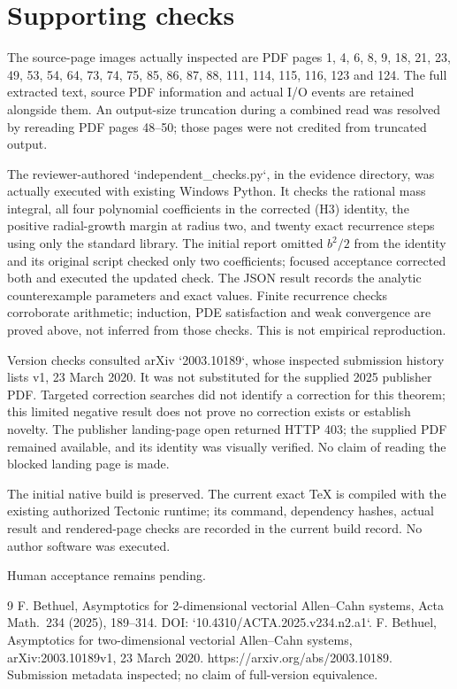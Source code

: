 \documentclass[10pt]{article}
\begin{document}
\section*{Supporting checks}
The source-page images actually inspected are PDF pages 1, 4, 6, 8, 9, 18, 21, 23, 49, 53, 54, 64, 73, 74, 75, 85, 86, 87, 88, 111, 114, 115, 116, 123 and 124. The full extracted text, source PDF information and actual I/O events are retained alongside them. An output-size truncation during a combined read was resolved by rereading PDF pages 48–50; those pages were not credited from truncated output.\par
The reviewer-authored `independent\_checks.py`, in the evidence directory, was actually executed with existing Windows Python. It checks the rational mass integral, all four polynomial coefficients in the corrected (H3) identity, the positive radial-growth margin at radius two, and twenty exact recurrence steps using only the standard library. The initial report omitted \(b^2/2\) from the identity and its original script checked only two coefficients; focused acceptance corrected both and executed the updated check. The JSON result records the analytic counterexample parameters and exact values. Finite recurrence checks corroborate arithmetic; induction, PDE satisfaction and weak convergence are proved above, not inferred from those checks. This is not empirical reproduction.\par
Version checks consulted arXiv `2003.10189`, whose inspected submission history lists v1, 23 March 2020. It was not substituted for the supplied 2025 publisher PDF. Targeted correction searches did not identify a correction for this theorem; this limited negative result does not prove no correction exists or establish novelty. The publisher landing-page open returned HTTP 403; the supplied PDF remained available, and its identity was visually verified. No claim of reading the blocked landing page is made.\par
The initial native build is preserved. The current exact TeX is compiled with the existing authorized Tectonic runtime; its command, dependency hashes, actual result and rendered-page checks are recorded in the current build record. No author software was executed.\par
Human acceptance remains pending.\par
9 F. Bethuel, Asymptotics for 2-dimensional vectorial Allen–Cahn systems, Acta Math. 234 (2025), 189–314. DOI: `10.4310/ACTA.2025.v234.n2.a1`. F. Bethuel, Asymptotics for two-dimensional vectorial Allen–Cahn systems, arXiv:2003.10189v1, 23 March 2020. https://arxiv.org/abs/2003.10189. Submission metadata inspected; no claim of full-version equivalence.\par
\end{document}
